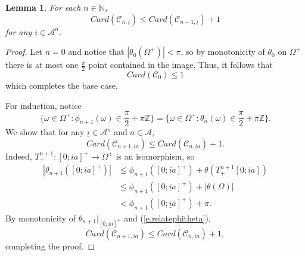 \documentclass{amsart}
\newtheorem{lemma}{Lemma}
\newcommand{\NN}{\mathbb{N}}
\newcommand{\ZZ}{\mathbb{Z}}
\newcommand{\A}{\mathcal{A}}
\newcommand{\C}{\mathcal{C}}
\begin{document}
\begin{lemma}\label{l.upperboundofbadpoints}
    For each $n\in \NN$,
    \[Card(\C_{n,\underline{i}}) \leq Card(\C_{n - 1, \underline{i}}) + 1\]
    for any $\underline{i}\in \A^n$. 
\end{lemma}
\begin{proof}
    Let $n = 0$ and notice that $|\theta_0(\Omega^+)| < \pi$, so by monotonicity of $\theta_0$ on $\Omega^+$ there is at most one $\frac{\pi}{2}$ point contained in the image. Thus, it follows that
    \[Card(\C_0) \leq 1\]
    which completes the base case.
    
    For induction, notice 
    \begin{equation}\label{e.relatephitheta}
        \{\omega\in \Omega^+: \phi_{n+1}(\omega)\in \frac{\pi}{2}+\pi\ZZ\} = \{\omega\in \Omega^+: \theta_n(\omega)\in \frac{\pi}{2} + \pi\ZZ\}.
    \end{equation}
    We show that for any $\underline{i}\in \A^n$ and $a\in \A$,
    \[Card(\C_{n+1, \underline{i}a}) \leq Card(\C_{n,\underline{i}a}) + 1.\]
    Indeed, $T^{n+1}_+: [0;\underline{i}a]^+ \rightarrow \Omega^+$ is an isomorphism, so
    \begin{align*}
        |\theta_{n+1}([0;\underline{i}a]^+)| &\leq \phi_{n+1}([0;\underline{i}a]^+) + \theta(T^{n+1}_+[0;\underline{i}a])\\
        &\leq \phi_{n+1}([0;\underline{i}a]^+) + |\theta(\Omega)|\\
        &< \phi_{n+1}([0;\underline{i}a]^+) + \pi.
    \end{align*}
    By monotonicity of $\theta_{n+1}|_{[0;\underline{i}a]^+}$ and (\ref{e.relatephitheta}), 
    \[Card(\C_{n+1, \underline{i}a}) \leq Card(\C_{n,\underline{i}a}) + 1,\]
    completing the proof.
\end{proof}
\end{document}
